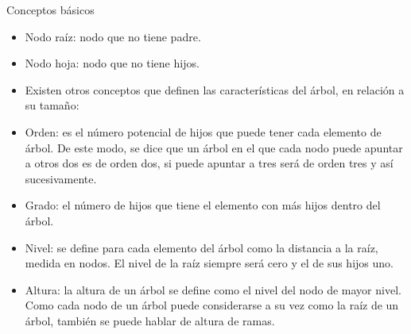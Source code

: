 \documentclass[handout]{beamer} %
\begin{document}
\begin{frame}{Conceptos básicos}
\begin{itemize}
 \item  Nodo raíz: nodo que no tiene padre.
\item  Nodo hoja: nodo que no tiene hijos.
  \item Existen otros conceptos que definen las características del árbol, en relación a su tamaño:
  \item Orden: es el número potencial de hijos que puede tener cada elemento de árbol. De este modo, se dice que un árbol en el que cada nodo puede apuntar a otros dos es de orden dos, si puede apuntar a tres será de orden tres y así sucesivamente.
  \item Grado: el número de hijos que tiene el elemento con más hijos dentro del árbol.
  \item Nivel: se define para cada elemento del árbol como la distancia a la raíz, medida en nodos. El nivel de la raíz siempre será cero y el de sus hijos uno.
  \item Altura: la altura de un árbol se define como el nivel del nodo de mayor nivel. Como cada nodo de un árbol puede considerarse a su vez como la raíz de un árbol, también se puede hablar de altura de ramas.
\end{itemize}
\end{frame}
\end{document}
